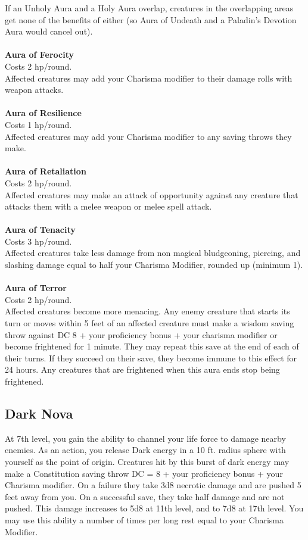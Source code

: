 \documentclass[10pt,twoside,twocolumn,openany]{book}
\begin{document}
If an Unholy Aura and a Holy Aura overlap, creatures in the overlapping areas get none of the benefits of either (so Aura of Undeath and a Paladin’s Devotion Aura would cancel out).\\\\
\textbf{Aura of Ferocity}\\
Costs 2 hp/round.\\
Affected creatures may add your Charisma modifier to their damage rolls with weapon attacks.\\\\
\textbf{Aura of Resilience}\\
Costs 1 hp/round.\\
Affected creatures may add your Charisma modifier to any saving throws they make.\\\\
\textbf{Aura of Retaliation}\\
Costs 2 hp/round.\\
Affected creatures may make an attack of opportunity against any creature that attacks them with a melee weapon or melee spell attack.\\\\
\textbf{Aura of Tenacity}\\
Costs 3 hp/round.\\
Affected creatures take less damage from non magical bludgeoning, piercing, and slashing damage equal to half your Charisma Modifier, rounded up (minimum 1).\\\\
\textbf{Aura of Terror}\\
Costs 2 hp/round.\\
Affected creatures become more menacing. Any enemy creature that starts its turn or moves within 5 feet of an affected creature must make a wisdom saving throw against DC 8 + your proficiency bonus + your charisma modifier or become frightened for 1 minute. They may repeat this save at the end of each of their turns. If they succeed on their save, they become immune to this effect for 24 hours. Any creatures that are frightened when this aura ends stop being frightened.

\subsection{Dark Nova}
At 7th level, you gain the ability to channel your life force to damage nearby enemies. As an action, you release Dark energy in a 10 ft. radius sphere with yourself as the point of origin. Creatures hit by this burst of dark energy may make a Constitution saving throw DC = 8 + your proficiency bonus + your Charisma modifier. On a failure they take 3d8 necrotic damage and are pushed 5 feet away from you. On a successful save, they take half damage and are not pushed. This damage increases to 5d8 at 11th level, and to 7d8 at 17th level. You may use this ability a number of times per long rest equal to your Charisma Modifier.
\end{document}
